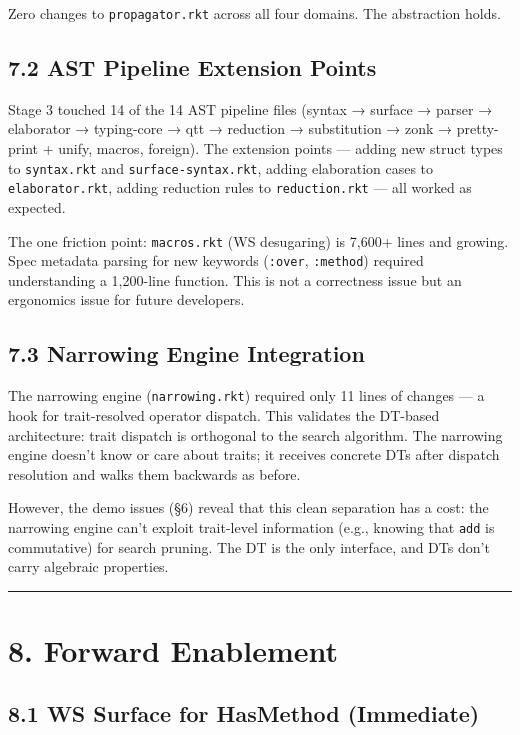 \documentclass[11pt]{article}
\begin{document}
Zero changes to \texttt{propagator.rkt} across all four domains. The abstraction holds.
\subsection{7.2 AST Pipeline Extension Points}
\label{sec:orgb2e0c4c}

Stage 3 touched 14 of the 14 AST pipeline files (syntax → surface → parser →
elaborator → typing-core → qtt → reduction → substitution → zonk → pretty-print +
unify, macros, foreign). The extension points — adding new struct types to \texttt{syntax.rkt}
and \texttt{surface-syntax.rkt}, adding elaboration cases to \texttt{elaborator.rkt}, adding
reduction rules to \texttt{reduction.rkt} — all worked as expected.

The one friction point: \texttt{macros.rkt} (WS desugaring) is 7,600+ lines and growing.
Spec metadata parsing for new keywords (\texttt{:over}, \texttt{:method}) required understanding a
1,200-line function. This is not a correctness issue but an ergonomics issue for
future developers.
\subsection{7.3 Narrowing Engine Integration}
\label{sec:orgdc2a0e4}

The narrowing engine (\texttt{narrowing.rkt}) required only 11 lines of changes — a hook
for trait-resolved operator dispatch. This validates the DT-based architecture: trait
dispatch is orthogonal to the search algorithm. The narrowing engine doesn't know or
care about traits; it receives concrete DTs after dispatch resolution and walks them
backwards as before.

However, the demo issues (§6) reveal that this clean separation has a cost: the
narrowing engine can't exploit trait-level information (e.g., knowing that \texttt{add} is
commutative) for search pruning. The DT is the only interface, and DTs don't carry
algebraic properties.

\noindent\rule{\textwidth}{0.5pt}
\section{8. Forward Enablement}
\label{sec:orgd13aba4}

\subsection{8.1 WS Surface for HasMethod (Immediate)}
\label{sec:orgd3f2e74}
\end{document}
